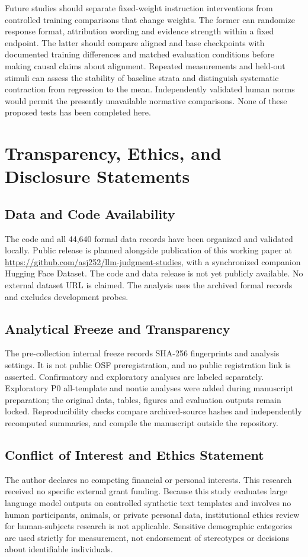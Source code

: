 \documentclass[11pt]{article}
\begin{document}
Future studies should separate fixed-weight instruction interventions from controlled training comparisons that change weights. The former can randomize response format, attribution wording and evidence strength within a fixed endpoint. The latter should compare aligned and base checkpoints with documented training differences and matched evaluation conditions before making causal claims about alignment. Repeated measurements and held-out stimuli can assess the stability of baseline strata and distinguish systematic contraction from regression to the mean. Independently validated human norms would permit the presently unavailable normative comparisons. None of these proposed tests has been completed here.

\section{Transparency, Ethics, and Disclosure Statements}
\subsection{Data and Code Availability}
The code and all 44,640 formal data records have been organized and validated locally. Public release is planned alongside publication of this working paper at \url{https://github.com/asj252/llm-judgment-studies}, with a synchronized companion Hugging Face Dataset. The code and data release is not yet publicly available. No external dataset URL is claimed. The analysis uses the archived formal records and excludes development probes.

\subsection{Analytical Freeze and Transparency}
The pre-collection internal freeze records SHA-256 fingerprints and analysis settings. It is not public OSF preregistration, and no public registration link is asserted. Confirmatory and exploratory analyses are labeled separately. Exploratory P0 all-template and nontie analyses were added during manuscript preparation; the original data, tables, figures and evaluation outputs remain locked. Reproducibility checks compare archived-source hashes and independently recomputed summaries, and compile the manuscript outside the repository.

\subsection{Conflict of Interest and Ethics Statement}
The author declares no competing financial or personal interests. This research received no specific external grant funding. Because this study evaluates large language model outputs on controlled synthetic text templates and involves no human participants, animals, or private personal data, institutional ethics review for human-subjects research is not applicable. Sensitive demographic categories are used strictly for measurement, not endorsement of stereotypes or decisions about identifiable individuals.
\end{document}
